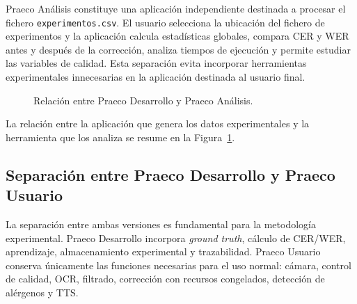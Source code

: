 Praeco Análisis constituye una aplicación independiente destinada a procesar el fichero \texttt{experimentos.csv}. El usuario selecciona la ubicación del fichero de experimentos y la aplicación calcula estadísticas globales, compara CER y WER antes y después de la corrección, analiza tiempos de ejecución y permite estudiar las variables de calidad. Esta separación evita incorporar herramientas experimentales innecesarias en la aplicación destinada al usuario final.

\begin{figure}[htbp]
	\centering
	\caption{Relación entre Praeco Desarrollo y Praeco Análisis.}
	\label{fig:praeco-analisis}
\end{figure}

La relación entre la aplicación que genera los datos experimentales y la herramienta que los analiza se resume en la Figura~\ref{fig:praeco-analisis}.

\newpage

\subsection{Separación entre Praeco Desarrollo y Praeco Usuario}

La separación entre ambas versiones es fundamental para la metodología experimental. Praeco Desarrollo incorpora \textit{ground truth}, cálculo de CER/WER, aprendizaje, almacenamiento experimental y trazabilidad. Praeco Usuario conserva únicamente las funciones necesarias para el uso normal: cámara, control de calidad, OCR, filtrado, corrección con recursos congelados, detección de alérgenos y TTS.


